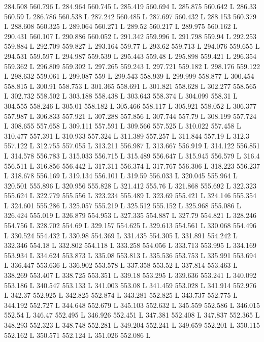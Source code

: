 284.508 560.796 L
284.964 560.745 L
285.419 560.694 L
285.875 560.642 L
286.33 560.59 L
286.786 560.538 L
287.242 560.485 L
287.697 560.432 L
288.153 560.379 L
288.608 560.325 L
289.064 560.271 L
289.52 560.217 L
289.975 560.162 L
290.431 560.107 L
290.886 560.052 L
291.342 559.996 L
291.798 559.94 L
292.253 559.884 L
292.709 559.827 L
293.164 559.77 L
293.62 559.713 L
294.076 559.655 L
294.531 559.597 L
294.987 559.539 L
295.443 559.48 L
295.898 559.421 L
296.354 559.362 L
296.809 559.302 L
297.265 559.243 L
297.721 559.182 L
298.176 559.122 L
298.632 559.061 L
299.087 559 L
299.543 558.939 L
299.999 558.877 L
300.454 558.815 L
300.91 558.753 L
301.365 558.691 L
301.821 558.628 L
302.277 558.565 L
302.732 558.502 L
303.188 558.438 L
303.643 558.374 L
304.099 558.31 L
304.555 558.246 L
305.01 558.182 L
305.466 558.117 L
305.921 558.052 L
306.377 557.987 L
306.833 557.921 L
307.288 557.856 L
307.744 557.79 L
308.199 557.724 L
308.655 557.658 L
309.111 557.591 L
309.566 557.525 L
310.022 557.458 L
310.477 557.391 L
310.933 557.324 L
311.389 557.257 L
311.844 557.19 L
312.3 557.122 L
312.755 557.055 L
313.211 556.987 L
313.667 556.919 L
314.122 556.851 L
314.578 556.783 L
315.033 556.715 L
315.489 556.647 L
315.945 556.579 L
316.4 556.511 L
316.856 556.442 L
317.311 556.374 L
317.767 556.306 L
318.223 556.237 L
318.678 556.169 L
319.134 556.101 L
319.59 556.033 L
320.045 555.964 L
320.501 555.896 L
320.956 555.828 L
321.412 555.76 L
321.868 555.692 L
322.323 555.624 L
322.779 555.556 L
323.234 555.489 L
323.69 555.421 L
324.146 555.354 L
324.601 555.286 L
325.057 555.219 L
325.512 555.152 L
325.968 555.086 L
326.424 555.019 L
326.879 554.953 L
327.335 554.887 L
327.79 554.821 L
328.246 554.756 L
328.702 554.69 L
329.157 554.625 L
329.613 554.561 L
330.068 554.496 L
330.524 554.432 L
330.98 554.369 L
331.435 554.305 L
331.891 554.242 L
332.346 554.18 L
332.802 554.118 L
333.258 554.056 L
333.713 553.995 L
334.169 553.934 L
334.624 553.873 L
335.08 553.813 L
335.536 553.753 L
335.991 553.694 L
336.447 553.636 L
336.902 553.578 L
337.358 553.52 L
337.814 553.463 L
338.269 553.407 L
338.725 553.351 L
339.18 553.295 L
339.636 553.241 L
340.092 553.186 L
340.547 553.133 L
341.003 553.08 L
341.459 553.028 L
341.914 552.976 L
342.37 552.925 L
342.825 552.874 L
343.281 552.825 L
343.737 552.775 L
344.192 552.727 L
344.648 552.679 L
345.103 552.632 L
345.559 552.586 L
346.015 552.54 L
346.47 552.495 L
346.926 552.451 L
347.381 552.408 L
347.837 552.365 L
348.293 552.323 L
348.748 552.281 L
349.204 552.241 L
349.659 552.201 L
350.115 552.162 L
350.571 552.124 L
351.026 552.086 L
